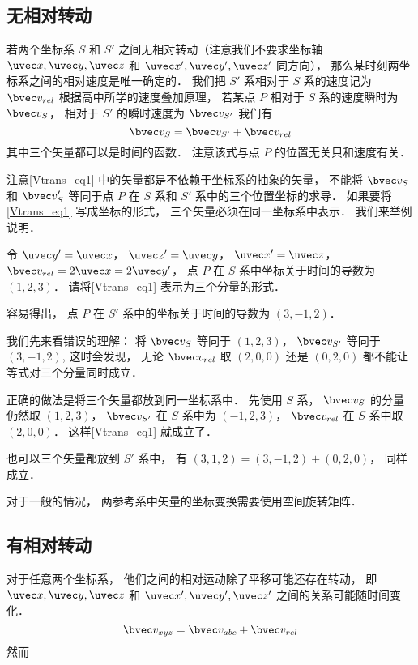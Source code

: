 


\subsection{无相对转动}
若两个坐标系 $S$ 和 $S'$ 之间无相对转动（注意我们不要求坐标轴 $\uvec x, \uvec y, \uvec z$ 和 $\uvec x', \uvec y', \uvec z'$ 同方向）， 那么某时刻两坐标系之间的相对速度是唯一确定的． 我们把 $S'$ 系相对于 $S$ 系的速度记为 $\bvec v_{rel}$ 根据高中所学的速度叠加原理， 若某点 $P$ 相对于 $S$ 系的速度瞬时为 $\bvec v_S$， 相对于 $S'$ 的瞬时速度为 $\bvec v_{S'}$ 我们有
\begin{equation}\label{Vtrans_eq1}
\bvec v_{S} = \bvec v_{S'} + \bvec v_{rel}
\end{equation}
其中三个矢量都可以是时间的函数． 注意该式与点 $P$ 的位置无关只和速度有关．

注意\autoref{Vtrans_eq1} 中的矢量都是不依赖于坐标系的抽象的矢量， 不能将 $\bvec v_S$ 和 $\bvec v_S'$ 等同于点 $P$ 在 $S$ 系和 $S'$ 系中的三个位置坐标的求导． 如果要将\autoref{Vtrans_eq1} 写成坐标的形式， 三个矢量必须在同一坐标系中表示． 我们来举例说明．

\begin{example}{}
令 $\uvec y' = \uvec x$， $\uvec z' = \uvec y$， $\uvec x' = \uvec z$， $\bvec v_{rel} = 2\uvec x = 2\uvec y'$， 点 $P$ 在 $S$ 系中坐标关于时间的导数为 $(1, 2, 3)$． 请将\autoref{Vtrans_eq1} 表示为三个分量的形式．

容易得出， 点 $P$ 在 $S'$ 系中的坐标关于时间的导数为 $(3, -1, 2)$．

我们先来看错误的理解： 将 $\bvec v_S$ 等同于 $(1, 2, 3)$， $\bvec v_{S'}$ 等同于 $(3, -1, 2)$,  这时会发现， 无论 $\bvec v_{rel}$ 取 $(2, 0, 0)$ 还是 $(0, 2, 0)$ 都不能让等式对三个分量同时成立．

正确的做法是将三个矢量都放到同一坐标系中． 先使用 $S$ 系， $\bvec v_S$ 的分量仍然取 $(1, 2, 3)$， $\bvec v_{S'}$ 在 $S$ 系中为 $(-1, 2, 3)$， $\bvec v_{rel}$ 在 $S$ 系中取 $(2, 0, 0)$． 这样\autoref{Vtrans_eq1} 就成立了．

也可以三个矢量都放到 $S'$ 系中， 有 $(3, 1, 2) = (3, -1, 2) + (0, 2, 0)$， 同样成立．
\end{example}

对于一般的情况， 两参考系中矢量的坐标变换需要使用空间旋转矩阵．

\subsection{有相对转动}
对于任意两个坐标系， 他们之间的相对运动除了平移可能还存在转动， 即 $\uvec x, \uvec y, \uvec z$ 和 $\uvec x', \uvec y', \uvec z'$ 之间的关系可能随时间变化．
\begin{equation}
\bvec v_{xyz} = \bvec v_{abc} + \bvec v_{rel}
\end{equation}
然而
